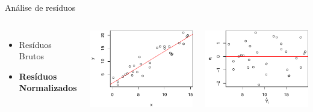 \documentclass{beamer}\usepackage[]{graphicx}\usepackage[]{color}
\newenvironment{knitrout}{}{} %
\renewenvironment{knitrout}{\setlength{\topsep}{0mm}}{}
\begin{document}
\begin{frame}{Análise de resíduos}

\begin{columns}[t]

\small

\begin{itemize}
\item Resíduos Brutos
\item \textbf{Resíduos Normalizados}
\end{itemize}


\begin{knitrout}
\color{fgcolor}
\includegraphics[width=1\linewidth]{figure/stdres-1} 

\includegraphics[width=1\linewidth]{figure/stdres-2} 

\end{knitrout}
\end{columns}


\end{frame}
\end{document}
